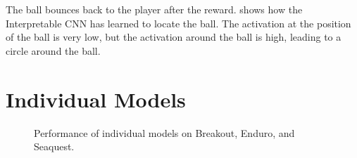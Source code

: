 The ball bounces back to the player after the reward.  shows how the Interpretable CNN has learned to locate the ball. The activation at the position of the ball is very low, but the activation around the ball is high, leading to a circle around the ball.


\FloatBarrier
\section{Individual Models}

\begin{figure}[ht!]
    \centering


    \caption{Performance of individual models on Breakout, Enduro, and Seaquest.}
    \label{fig:res:individual_models}
\end{figure}

